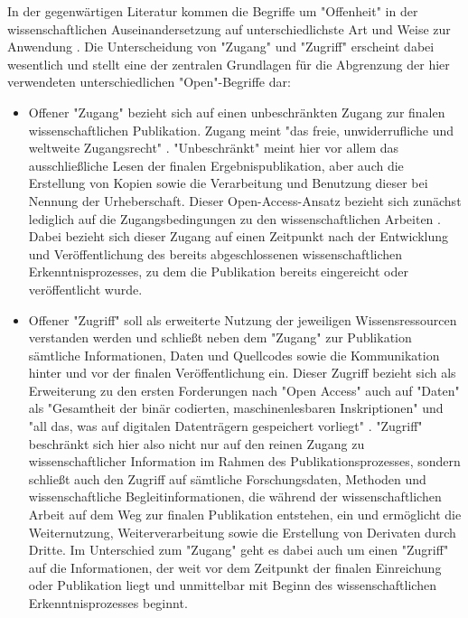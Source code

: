 In der gegenwärtigen Literatur kommen die Begriffe um "Offenheit" in der wissenschaftlichen Auseinandersetzung auf unterschiedlichste Art und Weise zur Anwendung \cite{cite:9}. Die Unterscheidung von "Zugang" und "Zugriff" erscheint dabei wesentlich und stellt eine der zentralen Grundlagen für die Abgrenzung der hier verwendeten unterschiedlichen "Open"-Begriffe dar:
\begin{itemize}
\item Offener "Zugang" bezieht sich auf einen unbeschränkten Zugang zur finalen wissenschaftlichen Publikation. Zugang meint "das freie, unwiderrufliche und weltweite Zugangsrecht" \cite{berliner_erklaerung_2003}. "Unbeschränkt" meint hier vor allem das ausschließliche Lesen der finalen Ergebnispublikation, aber auch die Erstellung von Kopien sowie die Verarbeitung und Benutzung dieser \cite{Lossau_oa_2007} bei Nennung der Urheberschaft. Dieser Open-Access-Ansatz bezieht sich zunächst lediglich auf die Zugangsbedingungen zu den wissenschaftlichen Arbeiten \cite{muller_2010_open}. Dabei bezieht sich dieser Zugang auf einen Zeitpunkt nach der Entwicklung und Veröffentlichung des bereits abgeschlossenen wissenschaftlichen Erkenntnisprozesses, zu dem die Publikation bereits eingereicht oder veröffentlicht wurde.
\item	Offener "Zugriff" soll als erweiterte Nutzung der jeweiligen Wissensressourcen verstanden werden und schließt neben dem "Zugang" zur Publikation sämtliche Informationen, Daten und Quellcodes sowie die Kommunikation hinter und vor der finalen Veröffentlichung \cite{hey_2015_open} ein. Dieser Zugriff bezieht sich als Erweiterung zu den ersten Forderungen nach "Open Access" auch auf "Daten" als "Gesamtheit der binär codierten, maschinenlesbaren Inskriptionen" und "all das, was auf digitalen Datenträgern gespeichert vorliegt" \cite{Burkhardt_2015}. "Zugriff" beschränkt sich hier also nicht nur auf den reinen Zugang zu wissenschaftlicher Information im Rahmen des Publikationsprozesses, sondern schließt auch den Zugriff auf sämtliche Forschungsdaten, Methoden und wissenschaftliche Begleitinformationen, die während der wissenschaftlichen Arbeit auf dem Weg zur finalen Publikation entstehen, ein und ermöglicht die Weiternutzung, Weiterverarbeitung sowie die Erstellung von Derivaten durch Dritte. Im Unterschied zum "Zugang" geht es dabei auch um einen "Zugriff" auf die Informationen, der weit vor dem Zeitpunkt der finalen Einreichung oder Publikation liegt und unmittelbar mit Beginn des wissenschaftlichen Erkenntnisprozesses beginnt.
\end{itemize}

